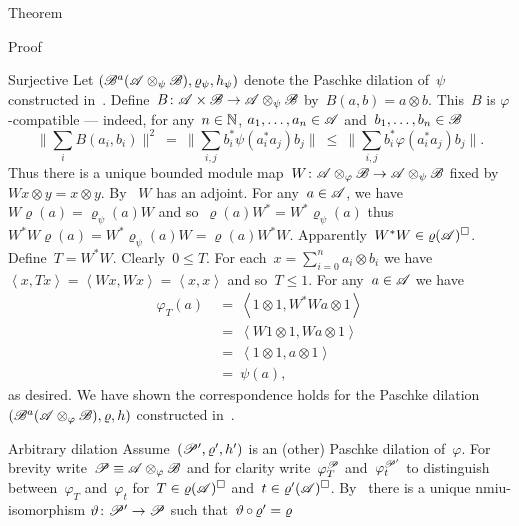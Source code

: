 \documentclass[b]{subfiles}
\begin{document}
\begin{parsec}
\begin{point}{Theorem}
\begin{point}{Proof}
\begin{point}{Surjective}
Let $(\mathscr{B}^a(\mathscr{A} \otimes_\psi \mathscr{B}),
    \varrho_\psi, h_\psi)$ denote the Paschke dilation of~$\psi$
    constructed in~.
Define~$B\colon \mathscr{A} \times \mathscr{B} \to \mathscr{A} \otimes_\psi \mathscr{B}$
    by~$B(a,b) = a \otimes b$.
This~$B$ is $\varphi$-compatible
--- indeed, for any~$n \in \mathbb{N}$, $a_1, \ldots, a_n \in \mathscr{A}$
    and~$b_1, \ldots, b_n \in \mathscr{B}$
\begin{equation*}
    \bigl\| \sum_i B(a_i, b_i) \bigr\|^2
     \ = \  \bigl\| \sum_{i,j}
                b_i^* \psi(a_i^*a_j) b_j \bigr\|
     \ \leq \  \bigl\| \sum_{i,j}
                b_i^* \varphi(a_i^*a_j) b_j \bigr\|.
\end{equation*}
Thus there is a unique bounded module
    map~$W \colon \mathscr{A} \otimes_\varphi \mathscr{B} \to \mathscr{A} \otimes_\psi \mathscr{B}$
    fixed by~$W x \otimes y = x \otimes y$.
By ~$W$ has an adjoint.
For any~$a\in\mathscr{A}$, we have~$W \varrho(a) = \varrho_\psi(a) W$
and so~$\varrho(a) W^* = W^* \varrho_\psi(a)$
thus~$W^*W \varrho(a) = W^* \varrho_\psi(a) W = \varrho(a) W^*W$.
Apparently~$W^*W \in \varrho(\mathscr{A})^\square$.
Define~$T = W^*W$. Clearly~$0\leq T$.
For each~$x = \sum^n_{i=0} a_i \otimes b_i$
    we have~$\left<x, Tx\right> = \left<Wx,Wx\right> = \left<x,x\right>$
    and so~$T \leq 1$.
For any~$a\in \mathscr{A}$ we have
\begin{align*}
    \varphi_T(a) &\ =\  \left<1\otimes 1, W^*W a \otimes 1\right> \\
    &  \ =\  \left<W 1\otimes 1, W a\otimes1\right> \\
    &  \ = \ \left<1\otimes1, a\otimes1\right> \\
    &  \ = \ \psi(a),
\end{align*}
    as desired.  We have shown the correspondence holds for
    the Paschke dilation~$(\mathscr{B}^a(\mathscr{A} \otimes_\varphi \mathscr{B}), \varrho, h)$
                constructed in~.
\end{point}
\begin{point}{Arbitrary dilation}%
Assume~$(\mathscr{P}', \varrho', h')$ is an (other) Paschke dilation
    of~$\varphi$.
For brevity write~$\mathscr{P} \equiv \mathscr{A} \otimes_\varphi \mathscr{B}$
    and for clarity
    write~$\varphi_T^{\mathscr{P}}$
        and~$\varphi_t^{\mathscr{P}'}$
    to distinguish between~$\varphi_T$ and~$\varphi_t$
    for~$T \in \varrho(\mathscr{A})^\square$ and~$t \in \varrho'(\mathscr{A})^\square$.
By~
    there is a unique nmiu-isomorphism
    $\vartheta\colon \mathscr{P}' \to \mathscr{P}$
    such that~$\vartheta \mathop{\circ} \varrho' = \varrho $

\end{point}
\end{point}
\end{point}
\end{parsec}
\end{document}
